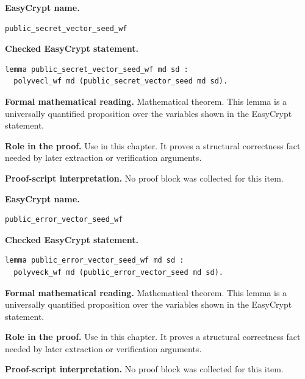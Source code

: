 \begin{formaltheorem}
\noindent\textbf{EasyCrypt name.}
\begin{lstlisting}[language=EasyCrypt,basicstyle=\ttfamily\scriptsize]
public_secret_vector_seed_wf
\end{lstlisting}
\noindent\textbf{Checked EasyCrypt statement.}
\begin{lstlisting}[language=EasyCrypt,basicstyle=\ttfamily\scriptsize]
lemma public_secret_vector_seed_wf md sd :
  polyvecl_wf md (public_secret_vector_seed md sd).
\end{lstlisting}
\noindent\textbf{Formal mathematical reading.}
Mathematical theorem. This lemma is a universally quantified proposition over the variables shown in the EasyCrypt statement.

\noindent\textbf{Role in the proof.}
Use in this chapter. It proves a structural correctness fact needed by later extraction or verification arguments.

\noindent\textbf{Proof-script interpretation.}
No proof block was collected for this item.

\end{formaltheorem}

\begin{formaltheorem}
\noindent\textbf{EasyCrypt name.}
\begin{lstlisting}[language=EasyCrypt,basicstyle=\ttfamily\scriptsize]
public_error_vector_seed_wf
\end{lstlisting}
\noindent\textbf{Checked EasyCrypt statement.}
\begin{lstlisting}[language=EasyCrypt,basicstyle=\ttfamily\scriptsize]
lemma public_error_vector_seed_wf md sd :
  polyveck_wf md (public_error_vector_seed md sd).
\end{lstlisting}
\noindent\textbf{Formal mathematical reading.}
Mathematical theorem. This lemma is a universally quantified proposition over the variables shown in the EasyCrypt statement.

\noindent\textbf{Role in the proof.}
Use in this chapter. It proves a structural correctness fact needed by later extraction or verification arguments.

\noindent\textbf{Proof-script interpretation.}
No proof block was collected for this item.

\end{formaltheorem}


